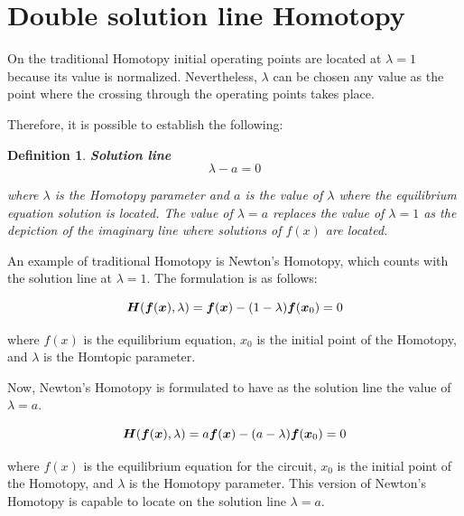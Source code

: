 \documentclass[conference,letterpaper,onecolumn]{IEEEtran}
\newcommand{\pig}[1]{\mbox{\boldmath ${#1}$}	}
\newtheorem{Theod}{{\bf Definition}}
\begin{document}
\section{Double solution line Homotopy}

On the traditional Homotopy \cite{homo_ArtificialP,homo_yamamura} initial operating points are located at $\lambda=1$ because its value is normalized. Nevertheless, $\lambda$ can be chosen any value as the point where the crossing through the operating points takes place.

Therefore, it is possible to establish the following:

\begin{Theod}
{\bf Solution line}
\begin{displaymath}
\lambda-a=0
\end{displaymath}

where $\lambda$ is the Homotopy parameter and $a$ is the value of $\lambda$ where the equilibrium equation solution is located. The value of $\lambda=a$ replaces the value of $\lambda=1$ as the depiction of the imaginary line where solutions of $f(x)$ are located.

\label{InestCond1}
\end{Theod}

An example of traditional Homotopy is Newton's Homotopy, which counts with the solution line at $\lambda=1$. The formulation is as follows:     

\begin{equation}
\pig{H}(\pig{f}(\pig{x}),\lambda ) =
\pig{f}(\pig{x})-(1-{\lambda})\pig{f}(\pig{x}_{0}) = 0
\label{lineasolH1}
\end{equation}

where $f(x)$ is the equilibrium equation, $x_0$ is the initial point of the Homotopy, and $\lambda$ is the Homtopic parameter.

Now, Newton's Homotopy is formulated to have as the solution line the value of $\lambda=a$.

\begin{equation}
\pig{H}(\pig{f}(\pig{x}),\lambda ) =
a\pig{f}(\pig{x})-(a-{\lambda})\pig{f}(\pig{x}_{0}) = 0
\label{lineasolH}
\end{equation}

where $f(x)$ is the equilibrium equation for the circuit,  $x_0$ is the initial point of the Homotopy, and $\lambda$ is the Homotopy parameter. This version of Newton's Homotopy is capable to locate on the solution line $\lambda=a$.
\end{document}
